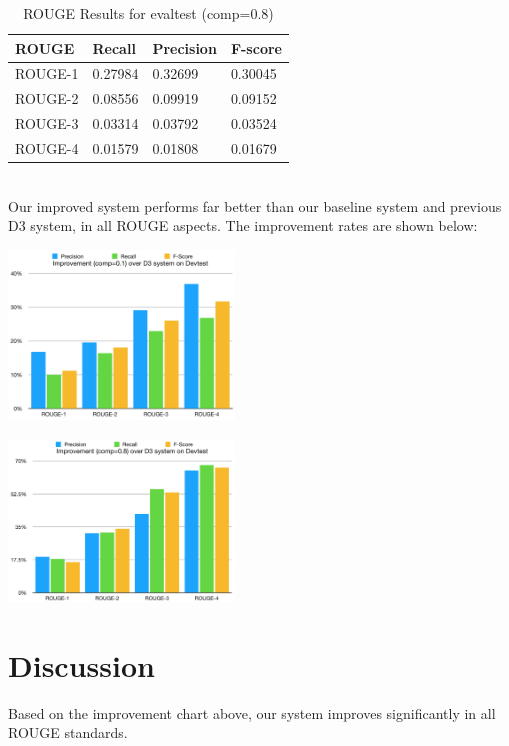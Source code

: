\documentclass[11pt]{article}
\begin{document}
\begin{table}[!ht]
\centering
\caption{ROUGE Results for evaltest (comp=0.8)}
\begin{tabular}{|l|l|l|l|}
\hline
ROUGE   & Recall  & Precision & F-score \\ \hline
ROUGE-1 & 0.27984 & 0.32699   & 0.30045 \\ \hline
ROUGE-2 & 0.08556 & 0.09919   & 0.09152 \\ \hline
ROUGE-3 & 0.03314 & 0.03792   & 0.03524 \\ \hline
ROUGE-4 & 0.01579 & 0.01808   & 0.01679 \\ \hline
\end{tabular}
\end{table}\\

\indent
Our improved system performs far better than our baseline system and previous D3 system, in all ROUGE aspects. The improvement rates are shown below:
\begin{center}
\includegraphics[width=0.45\textwidth]{perc_d4.png}
\end{center}
\begin{center}
\includegraphics[width=0.45\textwidth]{perc_d4_2.png}
\end{center}
\section{Discussion}
Based on the improvement chart above, our system improves significantly in all ROUGE standards. 
\end{document}
